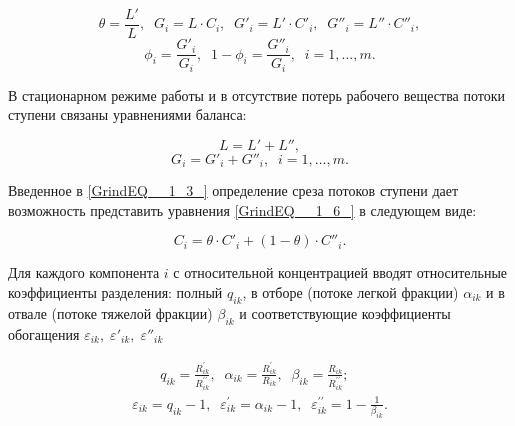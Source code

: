 \begin{equation} \label{GrindEQ__1_3_} 
  \theta =\frac{L'}{L} ,\;\;  G_{i} =L \cdot C_{i} ,\;\;  G'_{i} =L' \cdot C'_{i} ,\;\;  G''_{i} =L'' \cdot C''_{i} , 
  \end{equation} 
  \begin{equation} \label{GrindEQ__1_4_} 
  \phi _{i} =\frac{G'_{i} }{G_{i} } ,\;\;  1-\phi _{i} =\frac{G''_{i} }{G_{i} } ,\;\; i=1,...,m. 
  \end{equation} 

В стационарном режиме работы и в отсутствие потерь рабочего вещества потоки ступени связаны уравнениями баланса:

\begin{equation} \label{GrindEQ__1_5_} 
  L=L'+L'', 
  \end{equation} 
  \begin{equation} \label{GrindEQ__1_6_} 
  G_{i} =G'_{i} + G''_{i} ,\;\; i=1,...,m.             
\end{equation} 
  
Введенное в \ref{GrindEQ__1_3_} определение среза потоков ступени дает возможность представить уравнения \ref{GrindEQ__1_6_} в следующем виде:

\begin{equation} \label{GrindEQ__1_7_} 
  C_{i} =\theta  \cdot C'_{i} +(1-\theta ) \cdot C''_{i} . 
\end{equation} 

Для каждого компонента $i$ с относительной концентрацией вводят относительные коэффициенты разделения: полный $q_{ik}$, в отборе (потоке легкой фракции) $\alpha _{ik} $ и в отвале (потоке тяжелой фракции) $\beta _{ik} $ и соответствующие коэффициенты обогащения $\varepsilon _{ik} ,\; \varepsilon '_{ik} ,\; \varepsilon ''_{ik} \; $

\begin{equation} \label{GrindEQ__1_11_} 
  \begin{array}{l}
    \qquad q_{i k}=\frac{R_{i k}^{\prime}}{R_{i k}^{\prime \prime}},\;\; \alpha_{i k}=\frac{R_{i k}^{\prime}}{R_{i k}},\;\; \beta_{i k}=\frac{R_{i k}}{R_{i k}^{\prime \prime}} ;\;\; \\
    \varepsilon_{i k}=q_{i k}-1,\;\; \varepsilon_{i k}^{\prime}=\alpha_{i k}-1,\;\; \varepsilon_{i k}^{\prime \prime}=1-\frac{1}{\beta_{i k}} .
    \end{array}
\end{equation} 

